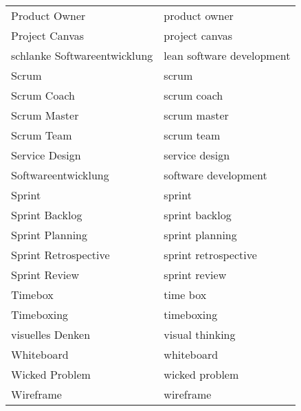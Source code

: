 \begin{spacing}{.5}
\begin{longtable}{ p{} p{}}
    Product Owner & product owner \\
    Project Canvas & project canvas \\
    schlanke Softwareentwicklung & lean software development \\
    Scrum & scrum \\
    Scrum Coach & scrum coach \\
    Scrum Master & scrum master \\
    Scrum Team & scrum team \\
    Service Design & service design \\
    Softwareentwicklung & software development \\
    Sprint & sprint \\
    Sprint Backlog & sprint backlog \\
    Sprint Planning & sprint planning \\
    Sprint Retrospective & sprint retrospective \\
    Sprint Review & sprint review \\
    Timebox & time box \\
    Timeboxing & timeboxing \\
    visuelles Denken & visual thinking \\
    Whiteboard & whiteboard \\
    Wicked Problem & wicked problem \\
    Wireframe & wireframe \\
\end{longtable}
\endgroup
\end{spacing}

\newpage

